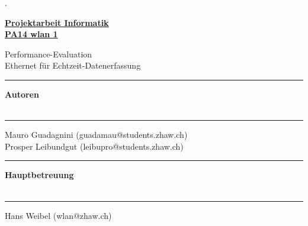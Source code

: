\AddToShipoutPicture{\BackgroundPic}

\begin{titlepage}


\begin{minipage}[b]{0.095\textwidth}
\hskip 0.05cm
\end{minipage}
\begin{minipage}[b]{0.91\textwidth}
\begin{tiny}.\end{tiny}\vskip 2.8cm
	{\huge
	
	\textbf{\underline{Projektarbeit Informatik}}\\
	\textbf{\underline{PA14 wlan 1}}
	
	Performance-Evaluation \\
    Ethernet für Echtzeit-Datenerfassung
	\vskip 0.5cm}
	
	\begin{minipage}[b]{0.27\textwidth}
	\hrule\vskip 0.5cm
		\textbf{Autoren}\\
		\\
	\end{minipage}
	\begin{minipage}[b]{0.03\textwidth}
	\hskip 0.5cm
	\end{minipage}
	\begin{minipage}[b]{0.7\textwidth}
	\hrule\vskip 0.5cm
		Mauro Guadagnini (guadamau@students.zhaw.ch)\\
		Prosper Leibundgut (leibupro@students.zhaw.ch)\\
	\end{minipage}
	
	\begin{minipage}[b]{0.27\textwidth}
	\hrule\vskip 0.5cm
		\textbf{Hauptbetreuung}\\
		\\
	\end{minipage}
	\begin{minipage}[b]{0.03\textwidth}
	\hskip 0.5cm
	\end{minipage}
	\begin{minipage}[b]{0.7\textwidth}
	\hrule\vskip 0.5cm
		Hans Weibel (wlan@zhaw.ch)\\
        \\
	\end{minipage}
	
	

\end{minipage}
\end{titlepage}
